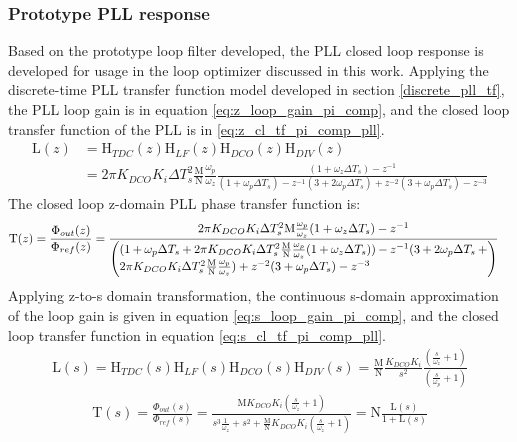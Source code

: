 		\subsubsection{Prototype PLL response}
		Based on the prototype loop filter developed, the PLL closed loop response is developed for usage in the loop optimizer discussed in this work. Applying the discrete-time PLL transfer function model developed in section \ref{discrete_pll_tf}, the PLL loop gain is in equation \ref{eq:z_loop_gain_pi_comp}, and the closed loop transfer function of the PLL is in \ref{eq:z_cl_tf_pi_comp_pll}.
		\begin{align}
			\mathrm{L}(z) &= \mathrm{H}_{TDC}(z)\mathrm{H}_{LF}(z)\mathrm{H}_{DCO}(z)\mathrm{H}_{DIV}(z) \\
			&= 2\pi K_{DCO}K_i\Delta T_s^2\frac{\mathrm{M}}{\mathrm{N}}\frac{\omega_p}{\omega_z}\frac{(1+\omega_z\Delta T_s)-z^{-1}}{(1+\omega_p\Delta T_s) - z^{-1}(3+2\omega_p\Delta T_s) + z^{-2}(3+\omega_p\Delta T_s) - z^{-3}}\label{eq:z_loop_gain_pi_comp}
		\end{align}
		The closed loop z-domain PLL phase transfer function is:
		\begin{align}\label{eq:z_cl_tf_pi_comp_pll}
			\mathrm{T}(z) = \frac{\Phi_{out}(z)}{\Phi_{ref}(z)} &= \frac{2\pi K_{DCO}K_i\Delta T_s^2\mathrm{M}\frac{\omega_p}{\omega_z}(1+\omega_z\Delta T_s)-z^{-1}}{\left(\parbox{4.2in}{$(1+\omega_p\Delta T_s + 2\pi K_{DCO}K_i\Delta T_s^2\frac{\mathrm{M}}{\mathrm{N}}\frac{\omega_p}{\omega_z}(1+\omega_z\Delta T_s))- z^{-1}(3+2\omega_p\Delta T_s+2\pi K_{DCO}K_i\Delta T_s^2\frac{\mathrm{M}}{\mathrm{N}}\frac{\omega_p}{\omega_z})+ z^{-2}(3+\omega_p\Delta T_s) - z^{-3}$}\right)}%
		\end{align}
		Applying z-to-s domain transformation, the continuous s-domain approximation of the loop gain is given in equation \ref{eq:s_loop_gain_pi_comp}, and the closed loop transfer function in equation \ref{eq:s_cl_tf_pi_comp_pll}.
		\begin{align}
			\mathrm{L}(s) = \mathrm{H}_{TDC}(s)\mathrm{H}_{LF}(s)\mathrm{H}_{DCO}(s)\mathrm{H}_{DIV}(s) = \frac{\mathrm{M}}{\mathrm{N}}\frac{K_{DCO}K_i}{s^2} \frac{\left(\frac{s}{\omega_z} + 1\right)}{\left(\frac{s}{\omega_p} + 1\right)}\label{eq:s_loop_gain_pi_comp}
		\end{align}
		\begin{align}\label{eq:s_cl_tf_pi_comp_pll}
			\mathrm{T}(s)=\frac{\Phi_{out}(s)}{\Phi_{ref}(s)} = \frac{\mathrm{M}K_{DCO}K_i\left(\frac{s}{\omega_z} + 1\right)}{s^3\frac{1}{\omega_z} + s^2 + \frac{\mathrm{M}}{\mathrm{N}}K_{DCO}K_i\left(\frac{s}{\omega_z} + 1\right)} = \mathrm{N}\frac{\mathrm{L}(s)}{1+\mathrm{L}(s)} 
		\end{align}



